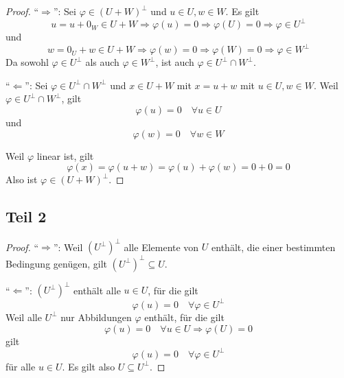 \documentclass[a4paper,10pt]{article}
\begin{document}
\begin{proof}
 ``$\Rightarrow$'': Sei $\varphi \in (U + W)^\perp$ und $u \in U, w \in W$.
 Es gilt
 \begin{equation}
  u = u + 0_W \in U + W \Rightarrow \varphi(u) = 0 \Rightarrow \varphi(U) = 0 \Rightarrow \varphi \in U^\perp
 \end{equation}
 und 
 \begin{equation}
  w = 0_U + w \in U + W \Rightarrow \varphi(w) = 0 \Rightarrow \varphi(W) = 0 \Rightarrow \varphi \in W^\perp
 \end{equation}
 Da sowohl $\varphi \in U^\perp$ als auch $\varphi \in W^\perp$, ist auch $\varphi \in U^\perp \cap W^\perp$.

 ``$\Leftarrow$'': Sei $\varphi \in U^\perp \cap W^\perp$ und $x \in U + W$ mit $x = u + w$ mit $u \in U, w \in W$.
 Weil $\varphi \in U^\perp \cap W^\perp$, gilt
 \begin{equation}
  \varphi(u) = 0 \quad \forall u \in U
 \end{equation}
 und
 \begin{equation}
  \varphi(w) = 0 \quad \forall w \in W
 \end{equation}

 Weil $\varphi$ linear ist, gilt
 \begin{equation}
  \varphi(x) = \varphi(u + w) = \varphi(u) + \varphi(w) = 0 + 0 = 0
 \end{equation}
 Also ist $\varphi \in (U + W)^\perp$.
\end{proof}

\subsection*{Teil 2}

\begin{proof}
 ``$\Rightarrow$'': Weil $(U^\perp)^\perp$ alle Elemente von $U$ enthält, die einer bestimmten Bedingung genügen, gilt $(U^\perp)^\perp \subseteq U$.
 
 ``$\Leftarrow$'': $(U^\perp)^\perp$ enthält alle $u \in U$, für die gilt
 \begin{equation}
  \varphi(u) = 0 \quad \forall \varphi \in U^\perp
 \end{equation}
 Weil alle $U^\perp$ nur Abbildungen $\varphi$ enthält, für die gilt
 \begin{equation}
  \varphi(u) = 0 \quad \forall u \in U \Rightarrow \varphi(U) = 0
 \end{equation}
 gilt
 \begin{equation}
  \varphi(u) = 0 \quad \forall \varphi \in U^\perp
 \end{equation}
 für alle $u \in U$.
 Es gilt also $U \subseteq U^\perp$.
\end{proof}
\end{document}
